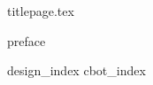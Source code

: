 \documentclass[12pt]{report}
\begin{document}
{titlepage.tex}

\tableofcontents{}
\newpage

{}

{preface}

{design_index}
{cbot_index}

\end{document}
